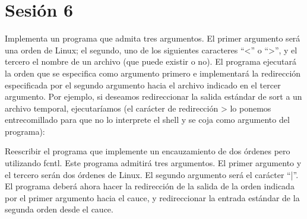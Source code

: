 \section{Sesión 6}

\begin{exercise}
Implementa un programa que admita tres argumentos. El primer argumento será
una orden de Linux; el segundo, uno de los siguientes caracteres “<” o “>”, y el tercero el
nombre de un archivo (que puede existir o no). El programa ejecutará la orden que se
especifica como argumento primero e implementará la redirección especificada por el
segundo argumento hacia el archivo indicado en el tercer argumento. Por ejemplo, si
deseamos redireccionar la salida estándar de sort a un archivo temporal, ejecutaríamos (el
carácter de redirección > lo ponemos entrecomillado para que no lo interprete el shell y se
coja como argumento del programa):
\end{exercise}

\begin{exercise}
Reescribir el programa que implemente un encauzamiento de dos órdenes pero
utilizando fcntl. Este programa admitirá tres argumentos. El primer argumento y el tercero
serán dos órdenes de Linux. El segundo argumento será el carácter “|”. El programa deberá
ahora hacer la redirección de la salida de la orden indicada por el primer argumento hacia el
cauce, y redireccionar la entrada estándar de la segunda orden desde el cauce.
\end{exercise}
